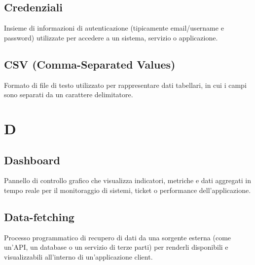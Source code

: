 \documentclass[a4paper, 11pt, oneside]{scrartcl} %
\begin{document}
\vspace{0.5cm}

\subsection*{Credenziali}


Insieme di informazioni di autenticazione (tipicamente email/username e password) utilizzate per accedere a un sistema, servizio o applicazione.

\vspace{0.5cm}

\subsection*{CSV (Comma-Separated Values)}
Formato di file di testo utilizzato per rappresentare dati tabellari, in cui i campi sono separati da un carattere delimitatore.
\vspace{0.5cm}



\section*{D}


\subsection*{Dashboard}


Pannello di controllo grafico che visualizza indicatori, metriche e dati aggregati in tempo reale per il monitoraggio di sistemi, ticket o performance dell'applicazione.

\vspace{0.5cm}

\subsection*{Data-fetching}


Processo programmatico di recupero di dati da una sorgente esterna (come un'API, un database o un servizio di terze parti) per renderli disponibili e visualizzabili all'interno di un'applicazione client.
\end{document}
